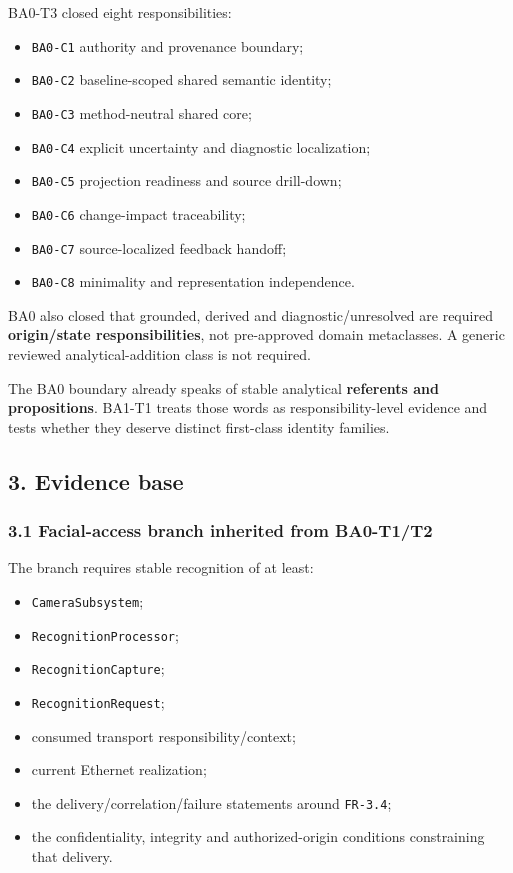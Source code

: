 \documentclass[
]{article}
\providecommand{\tightlist}{%
  \setlength{\itemsep}{0pt}\setlength{\parskip}{0pt}}
\begin{document}
BA0-T3 closed eight responsibilities:

\begin{itemize}
\tightlist
\item
  \texttt{BA0-C1} authority and provenance boundary;
\item
  \texttt{BA0-C2} baseline-scoped shared semantic identity;
\item
  \texttt{BA0-C3} method-neutral shared core;
\item
  \texttt{BA0-C4} explicit uncertainty and diagnostic localization;
\item
  \texttt{BA0-C5} projection readiness and source drill-down;
\item
  \texttt{BA0-C6} change-impact traceability;
\item
  \texttt{BA0-C7} source-localized feedback handoff;
\item
  \texttt{BA0-C8} minimality and representation independence.
\end{itemize}

BA0 also closed that grounded, derived and diagnostic/unresolved are
required \textbf{origin/state responsibilities}, not pre-approved domain
metaclasses. A generic reviewed analytical-addition class is not
required.

The BA0 boundary already speaks of stable analytical \textbf{referents
and propositions}. BA1-T1 treats those words as responsibility-level
evidence and tests whether they deserve distinct first-class identity
families.

\subsection{3. Evidence base}\label{3-evidence-base}

\subsubsection{3.1 Facial-access branch inherited from
BA0-T1/T2}\label{31-facial-access-branch-inherited-from-ba0-t1t2}

The branch requires stable recognition of at least:

\begin{itemize}
\tightlist
\item
  \texttt{CameraSubsystem};
\item
  \texttt{RecognitionProcessor};
\item
  \texttt{RecognitionCapture};
\item
  \texttt{RecognitionRequest};
\item
  consumed transport responsibility/context;
\item
  current Ethernet realization;
\item
  the delivery/correlation/failure statements around \texttt{FR-3.4};
\item
  the confidentiality, integrity and authorized-origin conditions
  constraining that delivery.
\end{itemize}
\end{document}

